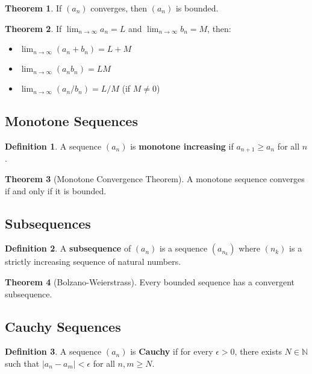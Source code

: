 \documentclass[11pt]{article}
\theoremstyle{definition}
\newtheorem{definition}{Definition}[section]
\newtheorem{theorem}{Theorem}[section]
\begin{document}
\begin{theorem}
If $(a_n)$ converges, then $(a_n)$ is bounded.
\end{theorem}

\begin{theorem}
If $\lim_{n \to \infty} a_n = L$ and $\lim_{n \to \infty} b_n = M$, then:
\begin{itemize}
    \item $\lim_{n \to \infty} (a_n + b_n) = L + M$
    \item $\lim_{n \to \infty} (a_n b_n) = LM$
    \item $\lim_{n \to \infty} (a_n / b_n) = L/M$ (if $M \neq 0$)
\end{itemize}
\end{theorem}

\subsection{Monotone Sequences}
\begin{definition}
A sequence $(a_n)$ is \textbf{monotone increasing} if $a_{n+1} \geq a_n$ for all $n$.
\end{definition}

\begin{theorem}[Monotone Convergence Theorem]
A monotone sequence converges if and only if it is bounded.
\end{theorem}

\subsection{Subsequences}
\begin{definition}
A \textbf{subsequence} of $(a_n)$ is a sequence $(a_{n_k})$ where $(n_k)$ is a strictly increasing sequence of natural numbers.
\end{definition}

\begin{theorem}[Bolzano-Weierstrass]
Every bounded sequence has a convergent subsequence.
\end{theorem}

\subsection{Cauchy Sequences}
\begin{definition}
A sequence $(a_n)$ is \textbf{Cauchy} if for every $\epsilon > 0$, there exists $N \in \mathbb{N}$ such that $|a_n - a_m| < \epsilon$ for all $n,m \geq N$.
\end{definition}
\end{document}
